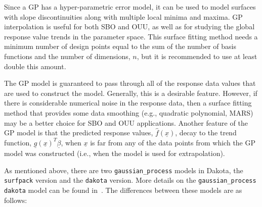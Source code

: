 Since a GP has a hyper-parametric error model, it can be used 
to model surfaces with slope discontinuities along with multiple 
local minima and maxima. GP interpolation is useful for both 
SBO and OUU, as well as for studying the global response value trends 
in the parameter space. This surface fitting method needs a 
minimum number of design points equal to the sum of the number of 
basis functions and the number of dimensions, $n$, but it is 
recommended to use at least double this amount.

The GP model is guaranteed to pass through all of the response 
data values that are used to construct the model. Generally, this is a
desirable feature. However, if there is considerable numerical noise
in the response data, then a surface fitting method that provides some
data smoothing (e.g., quadratic polynomial, MARS) may be a better
choice for SBO and OUU applications. Another feature of the GP
model is that the predicted response values, $\hat{f}(\underline{x})$,
decay to the trend function, 
$\underline{g}(\underline{x})^T\underline{\beta}$, when $\underline{x}$ 
is far from any of the data points from which the GP model was 
constructed (i.e., when the model is used for extrapolation). 

As mentioned above, there are two \texttt{gaussian\_process} models 
in Dakota, the \texttt{surfpack} version and the \texttt{dakota}
version.  More details on the \texttt{gaussian\_process dakota}
model can be found in~\cite{McF08}. The differences between these 
models are as follows: 

